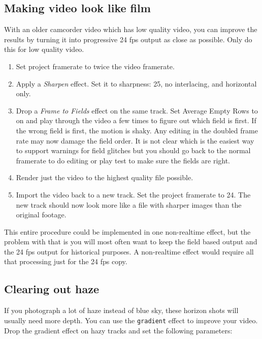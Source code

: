 \subsection{Making video look like film}%
\label{sub:making_video_look_film}

With an older camcorder video which has low quality video, you can improve the results by turning it into progressive 24 fps output as close as possible.  Only do this for low quality video.

\begin{enumerate}
	\item Set project framerate to twice the video framerate.
	\item Apply a \textit{Sharpen} effect. Set it to sharpness: 25, no interlacing, and horizontal only.
	\item Drop a \textit{Frame to Fields} effect on the same track. Set Average Empty Rows to on and play through 
	the video a few times to figure out which field is first. If the wrong field is first, the motion is shaky.
	Any editing in the doubled frame rate may now damage the field order. It is not clear which is the
	easiest way to support warnings for field glitches but you should go back to the normal framerate to
	do editing or play test to make sure the fields are right.
	\item Render just the video to the highest quality file possible.
	\item Import the video back to a new track. Set the project framerate to 24. The new track should now
	look more like a file with sharper images than the original footage.
\end{enumerate}

This entire procedure could be implemented in one non-realtime effect, but the problem with that is you will most often want to keep the field based output and the 24 fps output for historical purposes. A non-realtime effect would require all that processing just for the 24 fps copy.

\subsection{Clearing out haze}%
\label{sub:clearing_out_haze}

If you photograph a lot of haze instead of blue sky, these horizon shots will usually need more depth. You can use the \texttt{gradient} effect to improve your video. Drop the gradient effect on hazy tracks and set the following parameters:

